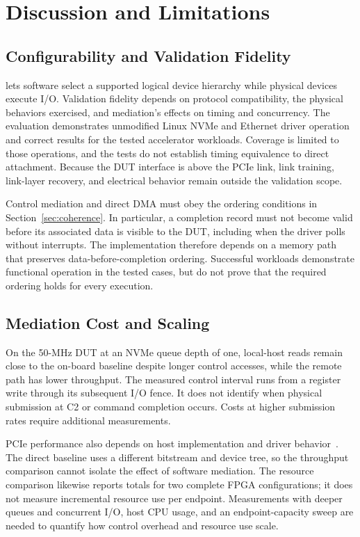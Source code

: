 \section{Discussion and Limitations}
\label{sec:discussion}

\subsection{Configurability and Validation Fidelity}

\sys lets software select a supported logical device hierarchy while
physical devices execute I/O. Validation fidelity depends on protocol
compatibility, the physical behaviors exercised, and mediation's effects
on timing and concurrency. The evaluation demonstrates unmodified Linux
NVMe and Ethernet driver operation and correct results for the tested
accelerator workloads. Coverage is limited to those operations, and the
tests do not establish timing equivalence to direct attachment. Because the
DUT interface is above the PCIe link, link training, link-layer recovery,
and electrical behavior remain outside the validation scope.

Control mediation and direct DMA must obey the ordering conditions in
Section~\ref{sec:coherence}. In particular, a completion record must not
become valid before its associated data is visible to the DUT, including
when the driver polls without interrupts. The implementation therefore
depends on a memory path that preserves data-before-completion ordering.
Successful workloads demonstrate functional operation in the tested cases,
but do not prove that the required ordering holds for every execution.

\subsection{Mediation Cost and Scaling}

On the 50-MHz DUT at an NVMe queue depth of one, local-host reads remain close
to the on-board baseline despite longer control accesses, while the remote
path has lower throughput. The measured control interval runs from a
register write through its subsequent I/O fence. It does not identify
when physical submission at C2 or command completion occurs. Costs at
higher submission rates require additional measurements.

PCIe performance also depends on host implementation and driver
behavior~\cite{neugebauer2018pcie}. The direct baseline uses a different
bitstream and device tree, so the throughput comparison cannot isolate the
effect of software mediation. The resource comparison likewise reports
totals for two complete FPGA configurations; it does not measure incremental
resource use per endpoint. Measurements with deeper queues and concurrent
I/O, host CPU usage, and an endpoint-capacity sweep are needed to quantify
how control overhead and resource use scale.

